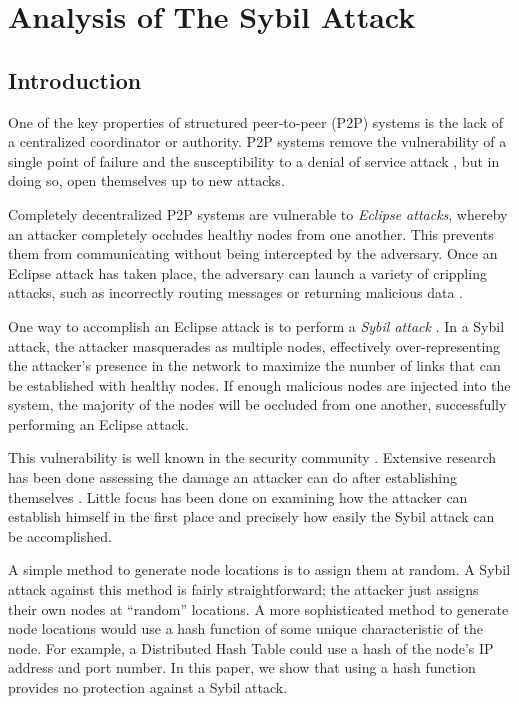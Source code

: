 \chapter{Analysis of The Sybil Attack}
\label{chapter:sybil}




\section{Introduction}
One of the key properties of structured peer-to-peer (P2P) systems is the lack of a centralized coordinator or authority.
P2P systems remove the vulnerability of a single point of failure and the susceptibility to a denial of service attack \cite{sybil}, but in doing so, open themselves up to new attacks.

Completely decentralized P2P systems are vulnerable to \textit{Eclipse attacks}, whereby an attacker completely occludes healthy nodes from one another.
This prevents them from communicating without being intercepted by the adversary.
Once an Eclipse attack has taken place, the adversary can launch a variety of crippling attacks, such as incorrectly routing messages or returning malicious data \cite{srivatsa2004vulnerabilities}.

One way to accomplish an Eclipse attack is to perform a \emph{Sybil attack} \cite{sybil}.
In a Sybil attack, the attacker masquerades as multiple nodes, effectively over-representing the attacker's presence in the network to maximize the number of links that can be established with healthy nodes.
If enough malicious nodes are injected into the system, the majority of the nodes will be occluded from one another, successfully performing an Eclipse attack.

This vulnerability is well known in the security community \cite{dhtsec}. 
Extensive research has been done assessing the damage an attacker can do after establishing themselves \cite{srivatsa2004vulnerabilities}.
Little focus has been done on examining how the attacker can establish himself in the first place and precisely how easily the Sybil attack can be accomplished.


A simple method to generate node locations is to assign them at random.
A Sybil attack against this method is fairly straightforward; the attacker just assigns their own nodes at ``random'' locations.
A more sophisticated method to generate node locations would use a hash function of some unique characteristic of the node.
For example, a Distributed Hash Table could use a hash of the node's IP address and port number.
In this paper, we show that using a hash function provides no protection against a Sybil attack.


